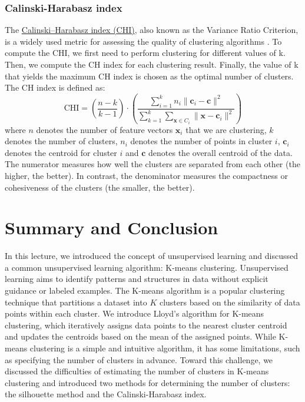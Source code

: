 \documentclass{article}[11pt]
\begin{document}
\subsubsection*{Calinski-Harabasz index}
The \href{https://en.wikipedia.org/wiki/Calinski%E2%80%93Harabasz_index}{Calinski–Harabasz index (CHI)}, also known as the Variance Ratio Criterion, 
is a widely used metric for assessing the quality of clustering algorithms \citep{Caliski01011974}. To compute the CHI, we first need to perform clustering for different values of k. 
Then, we compute the CH index for each clustering result. Finally, the value of k that yields the maximum CH index is chosen as the optimal number of clusters. The CH index is defined as:
\begin{equation}
\text{CHI} = \left(\frac{n-k}{k-1}\right)\cdot\left(\frac{\sum_{i=1}^{k}n_{i}\lVert{\mathbf{c}_{i}-\mathbf{c}}\rVert^{2}}{\sum_{k=1}^{k}\sum_{\mathbf{x}\in{C_{i}}}\lVert{\mathbf{x}-\mathbf{c}_{i}}\rVert^{2}}\right)
\end{equation}
where $n$ denotes the number of feature vectors $\mathbf{x}_{i}$ that we are clustering, $k$ denotes the number of clusters, $n_{i}$ denotes the number of points in cluster $i$, $\mathbf{c}_{i}$ denotes the centroid for cluster $i$ and $\mathbf{c}$ denotes the overall centroid of the data. 
The numerator measures how well the clusters are separated from each other (the higher, the better). In contrast, the denominator measures the compactness or cohesiveness of the clusters (the smaller, the better).


\section{Summary and Conclusion}
In this lecture, we introduced the concept of unsupervised learning and discussed a common unsupervised learning algorithm: K-means clustering.
Unsupervised learning aims to identify patterns and structures in data without explicit guidance or labeled examples.
The K-means algorithm is a popular clustering technique that partitions a dataset into $K$ clusters based on the similarity of data points within each cluster.
We introduce Lloyd's algorithm for K-means clustering, which iteratively assigns data points to the nearest cluster centroid and updates the centroids based on the mean of the assigned points. While K-means clustering is a simple and intuitive algorithm, it has some limitations, such as specifying the number of clusters in advance.
Toward this challenge, we discussed the difficulties of estimating the number of clusters in K-means clustering and introduced two methods for determining the number of clusters: the silhouette method and the Calinski-Harabasz index.




\end{document}
